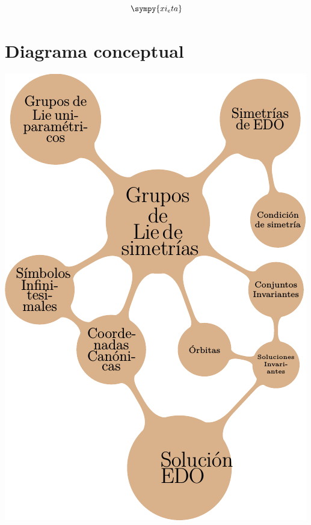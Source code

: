 \[\sympy{xi_eta}\]



\section{Diagrama conceptual}

\begin{center}
 \includegraphics[scale=.5]{imagenes/diagrama.png}
\end{center}


